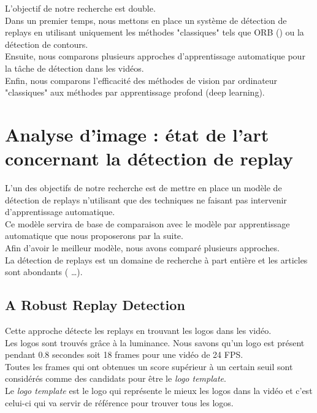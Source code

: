 \documentclass[11pt]{article}
\begin{document}
L'objectif de notre recherche est double.\\
Dans un premier temps, nous mettons en place un système de détection de replays en utilisant uniquement les méthodes "classiques" tels que ORB (\cite{Rublee_2011}) ou la détection de contours.\\
Ensuite, nous comparons plusieurs approches d'apprentissage automatique pour la tâche de détection dans les vidéos.\\
Enfin, nous comparons l'efficacité des méthodes de vision par ordinateur "classiques" aux méthodes par apprentissage profond (deep learning).\\

\newpage
\section{Analyse d'image : état de l'art concernant la détection de replay}
\label{sec:orgc6e3a14}
L'un des objectifs de notre recherche est de mettre en place un modèle de détection de replays n'utilisant que des techniques ne faisant pas intervenir d'apprentissage automatique.\\
Ce modèle servira de base de comparaison avec le modèle par apprentissage automatique que nous proposerons par la suite.\\
Afin d'avoir le meilleur modèle, nous avons comparé plusieurs approches.\\

La détection de replays est un domaine de recherche à part entière et les articles sont abondants (\cite{Hao_Pan_2002,Ling_Yu_Duan,Chu_2015,Javed_2019} \ldots{}).\\

\subsection{A Robust Replay Detection}
\label{sec:org36fca3c}
Cette approche \cite{xu11_robus_replay_detec_algor_soccer_video} détecte les replays en trouvant les logos dans les vidéo.\\
Les logos sont trouvés grâce à la luminance. Nous savons qu'un logo est présent pendant 0.8 secondes soit 18 frames pour une vidéo de 24 FPS.\\
Toutes les frames qui ont obtenues un score supérieur à un certain seuil sont considérés comme des candidats pour être le \emph{logo template}.\\
Le \emph{logo template} est le logo qui représente le mieux les logos dans la vidéo et c'est celui-ci qui va servir de référence pour trouver tous les logos.\\
\end{document}
